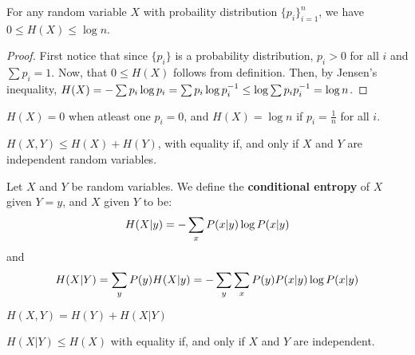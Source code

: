 \begin{theorem}\label{2.2.2}
    For any random variable $X$ with probaility distribution  $\{p_i\}_{i=1}^n$,
    we have $0 \leq H(X) \leq \log{n}$.
\end{theorem}
\begin{proof}
    First notice that since $\{p_i\}$ is a probability distribution,  $p_i>0$
    for all  $i$ and  $\sum{p_i}=1$. Now, that $0 \leq H(X)$ follows from
    definition. Then, by Jensen's inequality,
    $H(X)=-\sum{p_i\log{p_i}}=\sum{p_i\log{p_i^{-1}}} \leq
    \log{\sum{p_ip_i^{-1}}}=\log{n}$.
\end{proof}
\begin{corollary}
    $H(X)=0$ when atleast one $p_i=0$, and  $H(X)=\log{n}$ if $p_i=\frac{1}{n}$
    for all $i$.
\end{corollary}

\begin{theorem}\label{2.2.3}
    $H(X,Y) \leq H(X)+H(Y)$, with equality if, and only if $X$ and  $Y$ are
    independent random variables.
\end{theorem}

\begin{definition}
    Let $X$ and $Y$ be random variables. We define the \textbf{conditional
    entropy} of $X$ given  $Y=y$, and  $X$ given $Y$ to be:
    \begin{equation}
        H(X|y)=-\sum_x{P(x|y)\log{P(x|y)}} \\
    \end{equation}
    and
    \begin{equation}
        H(X|Y)=\sum_{y}{P(y)H(X|y)}=-\sum_y{\sum_x{P(y)}P(x|y)\log{P(x|y)}} \\
    \end{equation}
\end{definition}

\begin{theorem}\label{2.2.4}
    $H(X,Y)=H(Y)+H(X|Y)$
\end{theorem}
\begin{corollary}
    $H(X|Y) \leq H(X)$ with equality if, and only if $X$ and  $Y$ are
    independent.
\end{corollary}

